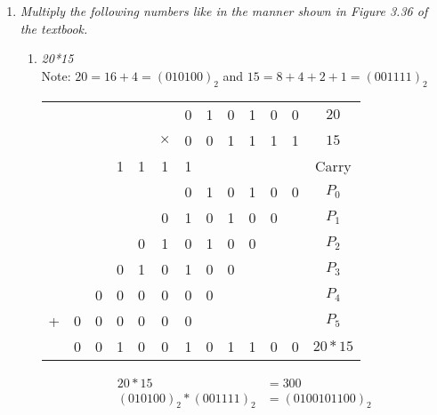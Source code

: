 \documentclass[12pt]{article}
\begin{document}
\begin{enumerate}
        \newpage
        \item \textit{Multiply the following numbers like in the manner shown in Figure 3.36 of the textbook.}
        \begin{enumerate}
          \item \textit{20*15} \\
            Note: $20 = 16 + 4 = (010100)_2$ and $15 = 8 + 4 + 2 + 1 = (001111)_2$
            \begin{center}
              \begin{tabular}{c c c c c c c c c c c c | c}
                &&&&&& 0 & 1 & 0 & 1 & 0 & 0 & $20$\\
                &&&&&$\times$ & 0 & 0 & 1 & 1 & 1 & 1 & $15$\\
                \hline
                &&& 1 & 1 & 1 & 1 & &&&&& Carry \\
                &&&&&& 0 & 1 & 0 & 1 & 0 & 0 & $P_0$ \\
                &&&&& 0 & 1 & 0 & 1 & 0 & 0 && $P_1$ \\
                &&&& 0 & 1 & 0 & 1 & 0 & 0 &&& $P_2$ \\
                &&& 0 & 1 & 0 & 1 & 0 & 0 &&&& $P_3$ \\
                && 0 & 0 & 0 & 0 & 0 & 0 &&&&& $P_4$ \\
                + & 0 & 0 & 0 & 0 & 0 & 0 &&&&&& $P_5$ \\
                \hline
                & 0 & 0 & 1 & 0 & 0 & 1 & 0 & 1 & 1 & 0 & 0 & $20*15$
              \end{tabular}
              \begin{align*}
                20*15 &= 300 \\
                (010100)_2 * (001111)_2 &= \boxed{(0100101100)_2}
              \end{align*}
            \end{center}


\end{enumerate}
\end{enumerate}
\end{document}
